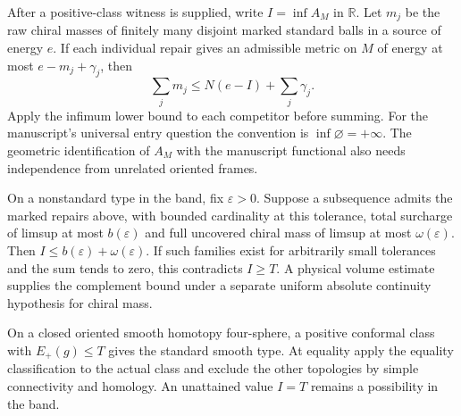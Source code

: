 \begin{proposition}
\label{prop:master-replacement}
After a positive-class witness is supplied, write \(I=\inf A_M\) in
\(\mathbb R\). Let \(m_j\) be the raw chiral masses of finitely many
disjoint marked standard balls in a source of energy \(e\). If each
individual repair gives an admissible metric on \(M\) of energy at
most \(e-m_j+\gamma_j\), then
\[
  \sum_j m_j\le N(e-I)+\sum_j\gamma_j .
\]
Apply the infimum lower bound to each competitor before summing.
For the manuscript's universal entry question the convention is
\(\inf\varnothing=+\infty\). The geometric identification of \(A_M\)
with the manuscript functional also needs independence from unrelated
oriented frames.
\end{proposition}

\begin{corollary}
\label{cor:master-repair-residual}
On a nonstandard type in the band, fix \(\varepsilon>0\).
Suppose a subsequence admits the marked repairs above, with bounded
cardinality at this tolerance, total surcharge of limsup at most
\(b(\varepsilon)\) and full uncovered chiral mass of limsup at most
\(\omega(\varepsilon)\). Then \(I\le b(\varepsilon)+\omega(\varepsilon)\).
If such families exist for arbitrarily small tolerances and the sum
tends to zero, this contradicts \(I\ge T\). A physical volume estimate
supplies the complement bound under a separate uniform absolute
continuity hypothesis for chiral mass.
\end{corollary}

\begin{proposition}
\label{prop:master-recognition}
On a closed oriented smooth homotopy four-sphere, a positive conformal
class with \(E_+(g)\le T\) gives the standard smooth type. At equality
apply the equality classification to the actual class and exclude
the other topologies by simple connectivity and homology.
An unattained value \(I=T\) remains a possibility in the band.
\end{proposition}

